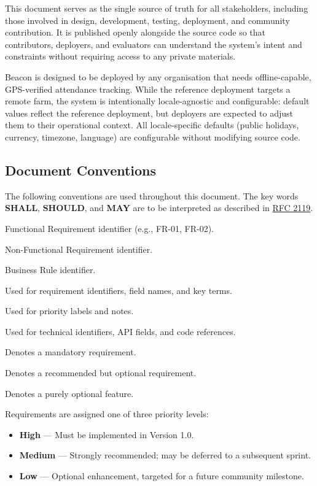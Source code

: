 \documentclass[12pt, a4paper]{article}
\begin{document}
This document serves as the single source of truth for all stakeholders,
including those involved in design, development, testing, deployment, and
community contribution. It is published openly alongside the source code
so that contributors, deployers, and evaluators can understand the
system's intent and constraints without requiring access to any private
materials.

Beacon is designed to be deployed by any organisation that needs
offline-capable, GPS-verified attendance tracking. While the reference
deployment targets a remote farm, the system is intentionally
locale-agnostic and configurable: default values reflect the reference
deployment, but deployers are expected to adjust them to their
operational context. All locale-specific defaults (public holidays,
currency, timezone, language) are configurable without modifying source
code.

\subsection{Document Conventions}
The following conventions are used throughout this document. The key words
\textbf{SHALL}, \textbf{SHOULD}, and \textbf{MAY} are to be interpreted as
described in \href{https://datatracker.ietf.org/doc/html/rfc2119}{RFC 2119}.

\begin{description}[leftmargin=3cm, style=nextline]
    \item[\textbf{FR-XX}]   Functional Requirement identifier (e.g., FR-01, FR-02).
    \item[\textbf{NFR-XX}]  Non-Functional Requirement identifier.
    \item[\textbf{BR-XX}]   Business Rule identifier.
    \item[\textbf{Bold}]    Used for requirement identifiers, field names, and key terms.
    \item[\textit{Italic}]  Used for priority labels and notes.
    \item[\texttt{Monospace}] Used for technical identifiers, API fields, and code references.
    \item[SHALL]            Denotes a mandatory requirement.
    \item[SHOULD]           Denotes a recommended but optional requirement.
    \item[MAY]              Denotes a purely optional feature.
\end{description}

Requirements are assigned one of three priority levels:
\begin{itemize}
    \item \textbf{High} --- Must be implemented in Version 1.0.
    \item \textbf{Medium} --- Strongly recommended; may be deferred to a
          subsequent sprint.
    \item \textbf{Low} --- Optional enhancement, targeted for a future
          community milestone.
\end{itemize}
\end{document}
